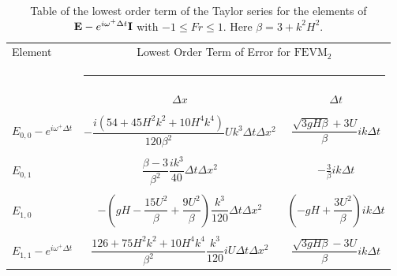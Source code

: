 \begin{table}
	\begin{tabular}{l  c c}
		\hline
		Element & \multicolumn{2}{c}{Lowest Order Term of Error for $\text{FEVM}_2$}\\
		&  \multicolumn{2}{l}{\rule{0.7\textwidth}{0.4pt}} \\
		& $\Delta x$&$\Delta t$\\
		\hline && \\
		$E_{0,0} -  e^{i \omega^+ \Delta t} $& $ -\dfrac{i \left(54 + 45H^2k^2 + 10H^4k^4\right)}{120\beta^2} U k^3 \Delta t \Delta x^2$ & $\dfrac{\sqrt{3gH \beta} + 3U}{\beta} ik \Delta t$ \\ & & \\
		$E_{0,1}$& $ \dfrac{\beta - 3}{\beta^2} \dfrac{ik^3}{40} \Delta  t\Delta x^2$ &  $ - \frac{3}{\beta} ik\Delta t$ \\ & & \\
		$E_{1,0}$& $ -\left(gH - \dfrac{15U^2}{\beta} + \dfrac{9U^2}{\beta}\right)  \dfrac{k^3}{120}\Delta t\Delta x^2$ &  $ \left(-gH + \dfrac{3U^2}{\beta}\right)ik \Delta t$ \\ & & \\
		$E_{1,1} -  e^{i \omega^+ \Delta t}$& $ \dfrac{126 + 75H^2 k^2 + 10 H^4 k^4}{\beta^2} \dfrac{k^3}{120} i U \Delta t\Delta x^2$ & $\dfrac{\sqrt{3gH \beta} - 3U}{\beta} ik \Delta t$ \\  \hline
	\end{tabular}
	\caption{Table of the lowest order term of the Taylor series for the elements of $\mathbf{E} - e^{i \omega^+ \Delta t} \mathbf{I}$ with $ -1 \le Fr \le 1$. Here $\beta = 3 + k^2 H^2$.}
	\label{tab:EerrFEVM2} 
\end{table}


